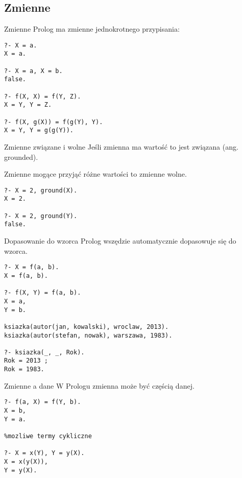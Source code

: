 \documentclass[blue]{beamer}
\begin{document}
\subsection{Zmienne}
\begin{frame}[fragile]{Zmienne}
Prolog ma zmienne jednokrotnego przypisania:
\begin{lstlisting}
?- X = a.
X = a.

?- X = a, X = b.
false.

?- f(X, X) = f(Y, Z).
X = Y, Y = Z.

?- f(X, g(X)) = f(g(Y), Y).
X = Y, Y = g(g(Y)).
\end{lstlisting}
\end{frame}
\begin{frame}[fragile]{Zmienne związane i wolne}
Jeśli zmienna ma wartość to jest związana (ang. grounded).

Zmienne mogące przyjąć różne wartości to zmienne wolne.
\begin{lstlisting}
?- X = 2, ground(X).
X = 2.

?- X = 2, ground(Y).
false.
\end{lstlisting}
\end{frame}
\begin{frame}[fragile]{Dopasowanie do wzorca}
Prolog wszędzie automatycznie dopasowuje się do wzorca.
\begin{lstlisting}
?- X = f(a, b).
X = f(a, b).

?- f(X, Y) = f(a, b).
X = a,
Y = b.

ksiazka(autor(jan, kowalski), wroclaw, 2013).
ksiazka(autor(stefan, nowak), warszawa, 1983).

?- ksiazka(_, _, Rok).
Rok = 2013 ;
Rok = 1983.
\end{lstlisting}
\end{frame}
\begin{frame}[fragile]{Zmienne a dane}
W Prologu zmienna może być częścią danej.
\begin{lstlisting}
?- f(a, X) = f(Y, b).
X = b,
Y = a.

%mozliwe termy cykliczne

?- X = x(Y), Y = y(X).
X = x(y(X)),
Y = y(X).
\end{lstlisting}
\end{frame}
\end{document}
